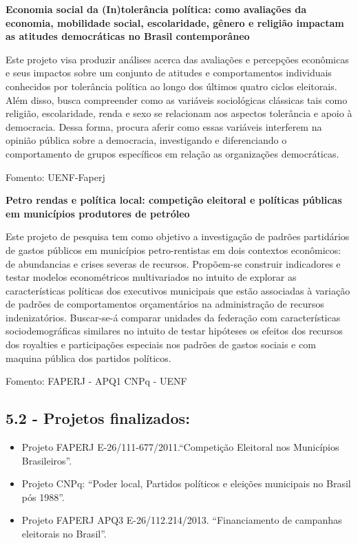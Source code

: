 \documentclass[
  12pt,
]{report}
\begin{document}
\textbf{Economia social da (In)tolerância política: como avaliações da
economia, mobilidade social, escolaridade, gênero e religião impactam as
atitudes democráticas no Brasil contemporâneo}

Este projeto visa produzir análises acerca das avaliações e percepções
econômicas e seus impactos sobre um conjunto de atitudes e
comportamentos individuais conhecidos por tolerância política ao longo
dos últimos quatro ciclos eleitorais. Além disso, busca compreender como
as variáveis sociológicas clássicas tais como religião, escolaridade,
renda e sexo se relacionam aos aspectos tolerância e apoio à democracia.
Dessa forma, procura aferir como essas variáveis interferem na opinião
pública sobre a democracia, investigando e diferenciando o comportamento
de grupos específicos em relação as organizações democráticas.

Fomento: UENF-Faperj

\textbf{Petro rendas e política local: competição eleitoral e políticas
públicas em municípios produtores de petróleo}

Este projeto de pesquisa tem como objetivo a investigação de padrões
partidários de gastos públicos em municípios petro-rentistas em dois
contextos econômicos: de abundancias e crises severas de recursos.
Propõem-se construir indicadores e testar modelos econométricos
multivariados no intuito de explorar as características políticas dos
executivos municipais que estão associadas à variação de padrões de
comportamentos orçamentários na administração de recursos
indenizatórios. Buscar-se-á comparar unidades da federação com
características sociodemográficas similares no intuito de testar
hipóteses os efeitos dos recursos dos royalties e participações
especiais nos padrões de gastos sociais e com maquina pública dos
partidos políticos.

Fomento: FAPERJ - APQ1 CNPq - UENF

\hypertarget{projetos-finalizados}{%
\subsection{5.2 - Projetos finalizados:}\label{projetos-finalizados}}

\begin{itemize}
\item
  Projeto FAPERJ E-26/111-677/2011.``Competição Eleitoral nos Municípios
  Brasileiros''.
\item
  Projeto CNPq: ``Poder local, Partidos políticos e eleições municipais
  no Brasil pós 1988''.
\item
  Projeto FAPERJ APQ3 E-26/112.214/2013. ``Financiamento de campanhas
  eleitorais no Brasil''.
\end{itemize}
\end{document}
